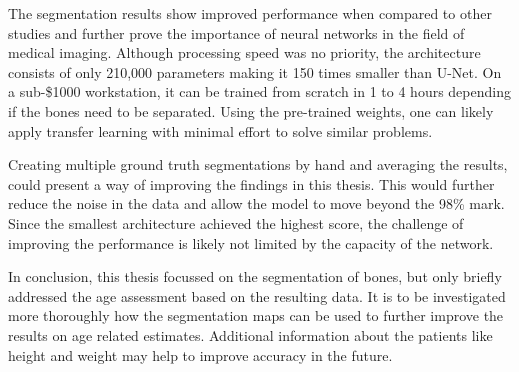 The segmentation results show improved performance when compared to other studies and further prove the importance of neural networks in the field of medical imaging. Although processing speed was no priority, the architecture consists of only 210,000 parameters making it 150 times smaller than U-Net. On a sub-\$1000 workstation, it can be trained from scratch in 1 to 4 hours depending if the bones need to be separated. Using the pre-trained weights, one can likely apply transfer learning with minimal effort to solve similar problems.

Creating multiple ground truth segmentations by hand and averaging the results, could present a way of improving the findings in this thesis. This would further reduce the noise in the data and allow the model to move beyond the 98\% mark. Since the smallest architecture achieved the highest score, the challenge of improving the performance is likely not limited by the capacity of the network.

In conclusion, this thesis focussed on the segmentation of bones, but only briefly addressed the age assessment based on the resulting data. It is to be investigated more thoroughly how the segmentation maps can be used to further improve the results on age related estimates. Additional information about the patients like height and weight may help to improve accuracy in the future.



\newpage